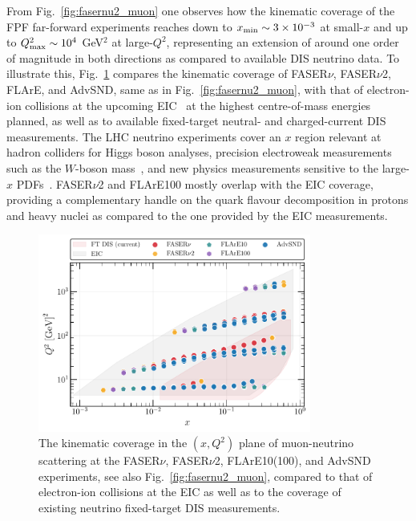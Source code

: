 From Fig.~\ref{fig:fasernu2_muon} one observes
how the kinematic coverage of the FPF far-forward experiments reaches down to
$x_{\rm min}\sim 3\times 10^{-3}$ at small-$x$ and up to $Q^2_{\rm max}\sim 10^4$ GeV$^2$
at large-$Q^2$, representing an extension
of around one order of magnitude in both directions as compared to available
DIS neutrino data.
%
To illustrate this,
Fig.~\ref{fig:Kin_nNNPDF30_EIC_FPF} compares
the kinematic coverage of FASER$\nu$, FASER$\nu$2, FLArE, and AdvSND, same as in
Fig.~\ref{fig:fasernu2_muon}, with that of electron-ion collisions
at the upcoming EIC~\cite{Khalek:2021ulf,AbdulKhalek:2021gbh} at the highest
centre-of-mass energies planned, as well as to available fixed-target
neutral- and charged-current DIS measurements.
%
The LHC neutrino experiments cover an $x$ region relevant
at hadron colliders for Higgs boson analyses,
precision electroweak measurements  such as the $W$-boson
mass~\cite{Amoroso:2023pey}, and new physics measurements sensitive
to the large-$x$ PDFs~\cite{Ball:2022qtp}.
%
FASER$\nu$2 and FLArE100 mostly overlap with the EIC coverage, providing a complementary handle
on the quark flavour decomposition in protons and heavy nuclei as compared
to the one provided by the EIC measurements.

\begin{figure}[t]
    \centering
    \includegraphics[width = 0.80\textwidth]{plots/KIN_DIS_FPF.pdf}
    \caption{
      The kinematic coverage in the $(x,Q^2)$ plane of muon-neutrino scattering
      at the FASER$\nu$, FASER$\nu$2, FLArE10(100), and AdvSND experiments, see also Fig.~\ref{fig:fasernu2_muon},
      compared to that of electron-ion collisions at the EIC
      as well as to the coverage of existing neutrino
      fixed-target DIS measurements.
    }
    \label{fig:Kin_nNNPDF30_EIC_FPF}
\end{figure}

